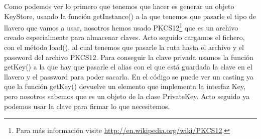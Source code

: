 Como podemos ver lo primero que tenemos que hacer es generar un objeto KeyStore, usando la función getInstance() a la que tenemos que pasarle el tipo de llavero que vamos a usar, nosotros hemos usado PKCS12\footnote{Para más información visite \url{http://en.wikipedia.org/wiki/PKCS12}.} que es un archivo creado especialmente para almacenar claves. Acto seguido cargamos el fichero, con el método load(), al cual tenemos que pasarle la ruta hasta el archivo y el password del archivo PKCS12. Para conseguir la clave privada usamos la función getKey() a la que hay que pasarle el alias con el que está guardada la clave en el llavero y el password para poder sacarla. En el código se puede ver un casting ya que la función getKey() devuelve un elemento que implementa la interfaz Key, pero nosotros sabemos que es un objeto de la clase PrivateKey. Acto seguido ya podemos usar la clave para firmar lo que necesitemos.









 

